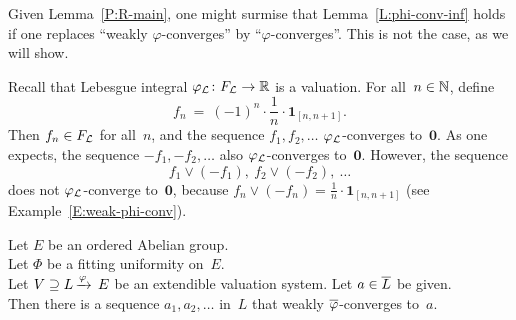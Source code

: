 \documentclass[main.tex]{subfiles}
\begin{document}
%
%
\begin{ex}
\label{E:phi-conv-inf}
Given Lemma~\ref{P:R-main},
one might surmise that Lemma~\ref{L:phi-conv-inf}
holds if one replaces ``weakly $\varphi$-converges''
by
``$\varphi$-converges''.
This is not the case, as we will show.

Recall that  Lebesgue integral $\varphi_{\mathcal{L}}\colon F_{\mathcal{L}} \rightarrow \mathbb{R}$
is a valuation.
For all~$n\in \mathbb{N}$, define
\begin{equation*}
f_n \ = \ (-1)^{n} \cdot \textstyle{\frac{1}{n}}\cdot \mathbf{1}_{[n,n+1]}.
\end{equation*}
Then $f_n\in F_{\mathcal{L}}$ for all~$n$, 
and the sequence $f_1,f_2,\dotsc $ $\varphi_{\mathcal{L}}$-converges to~$\mathbf{0}$.
As one expects,
the sequence $-f_1,-f_2,\dotsc$ 
also
 $\varphi_{\mathcal{L}}$-converges to~$\mathbf{0}$.
However, the sequence 
\begin{equation*} 
f_1\vee(-f_1),\  f_2\vee(-f_2),\ \dotsc
\end{equation*}
does not $\varphi_{\mathcal{L}}$-converge to~$\mathbf{0}$,
because $f_n \vee (-f_n) = \frac{1}{n}\cdot \mathbf{1}_{[n,n+1]}$
(see Example~\ref{E:weak-phi-conv}).
\end{ex}
%
%
\begin{lem}
\label{L:fitting-phi-conv-dense}
Let $E$ be an ordered Abelian group.\\
Let $\Phi$ be a fitting uniformity on~$E$.\\
Let $V \supseteq L\,\smash{\xrightarrow{\varphi}\,E}$ be an extendible valuation system.
Let $a\in \overline L$ be given.\\
Then there is a sequence
$a_1,a_2,\dotsc$ in~$L$
that weakly $\overline\varphi$-converges to~$a$.
\end{lem}
\end{document}
